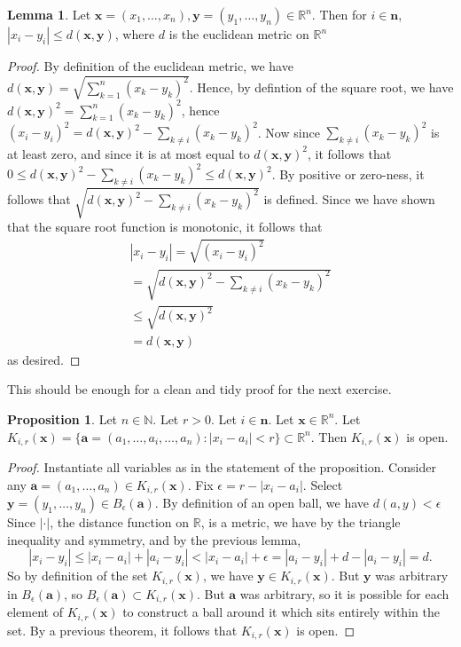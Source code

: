 \documentclass[11pt]{article}
\newcommand{\R}{\mathbb{R}}
\newcommand{\N}{\mathbb{N}}
\theoremstyle{definition}
\newtheorem{proposition}{Proposition}
\newtheorem{lemma}{Lemma}
\begin{document}
\begin{lemma}
Let $\mathbf{x} = (x_1,\dots,x_n), \mathbf{y} = (y_1,\dots,y_n)\in \R^n$. Then for $i\in \mathbf{n}$, $|x_i - y_i|\le d(\mathbf{x},\mathbf{y})$, where $d$ is the euclidean metric on $\R^n$
\end{lemma}
\begin{proof}
By definition of the euclidean metric, we have $d(\mathbf{x},\mathbf{y}) = \sqrt{\sum_{k = 1}^n (x_k-y_k)^2}$. Hence, by defintion of the square root, we have  $ d(\mathbf{x},\mathbf{y})^2 = \sum_{k = 1}^n (x_k-y_k)^2 $, hence $(x_i-y_i)^2 = d(\mathbf{x},\mathbf{y})^2 -  \sum_{k\ne i}(x_k-y_k)^2$. Now since $\sum_{k\ne i}(x_k-y_k)^2$ is at least zero, and since it is at most equal to $d(\mathbf{x},\mathbf{y})^2$, it follows that $0\le d(\mathbf{x},\mathbf{y})^2 -  \sum_{k\ne i}(x_k-y_k)^2\le d(\mathbf{x},\mathbf{y})^2$. By positive or zero-ness, it follows that $\sqrt{d(\mathbf{x},\mathbf{y})^2 -  \sum_{k\ne i}(x_k-y_k)^2}$ is defined. Since we have shown that the square root function is monotonic, it follows that 
\[
\begin{array}{c}
|x_i-y_i| = \sqrt{(x_i-y_i)^2}\\
= \sqrt{d(\mathbf{x},\mathbf{y})^2 -  \sum_{k\ne i}(x_k-y_k)^2} \\
\le \sqrt{d(\mathbf{x},\mathbf{y})^2} \\
= d(\mathbf{x},\mathbf{y})
\end{array}
\] as desired.
\end{proof}

This should be enough for a clean and tidy proof for the next exercise.\\



\begin{proposition} Let $n\in \N$. Let $r> 0$. Let $i\in \mathbf{n}$. Let $\mathbf{x} \in \R^n$. Let $K_{i,r}(\mathbf{x}) = \{\mathbf{a} = (a_1,\dots, a_i, \dots, a_n): |x_i - a_i| < r \}\subset \R^n$. Then $K_{i,r}(\mathbf{x})$ is open. 
\end{proposition}
\begin{proof}
Instantiate all variables as in the statement of the proposition. Consider any $\mathbf{a} = (a_1,\dots, a_n) \in K_{i,r}(\mathbf{x})$. Fix $\epsilon = r - |x_i - a_i|$. Select $\mathbf{y} = (y_1,\dots, y_n)\in B_\epsilon(\mathbf{a})$. By definition of an open ball, we have $d(a,y)< \epsilon $Since $|\cdot|$, the distance function on $\R$, is a metric, we have by the triangle inequality and symmetry, and by the previous lemma, \[|x_i - y_i|\le |x_i - a_i| + |a_i - y_i| < |x_i-a_i| + \epsilon = |a_i - y_i| + d - |a_i - y_i| = d.
\]
So by definition of the set $K_{i,r}(\mathbf{x}) $, we have $\mathbf{y}\in K_{i,r}(\mathbf{x})$. But $\mathbf{y}$ was arbitrary in $B_\epsilon(\mathbf{a})$, so $B_\epsilon (\mathbf{a})\subset K_{i,r}(\mathbf{x}) $. But $\mathbf{a}$ was arbitrary, so it is possible for each element of $K_{i,r}(\mathbf{x})$ to construct a ball around it which sits entirely within the set. By a previous theorem, it follows that $K_{i,r}(\mathbf{x})$ is open.
\end{proof}
\end{document}
